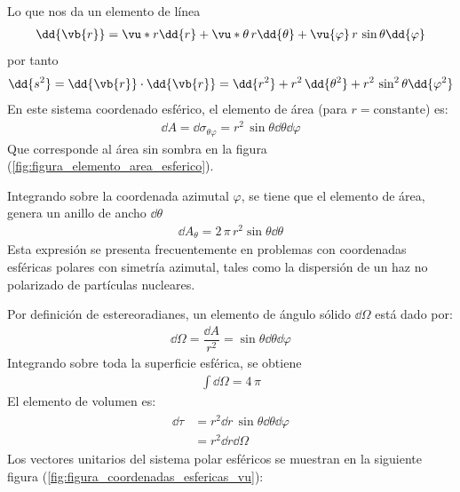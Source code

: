 Lo que nos da un elemento de línea
\begin{align*}
\dd{\vb{r}} = \vu*{r} \dd{r} + \vu*{\theta} \, r \dd{\theta} + \vu{\varphi} \, r \, \sin \theta \dd{\varphi}
\end{align*}
por tanto
\begin{align*}
\dd{s^{2}} = \dd{\vb{r}} \cdot \dd{\vb{r}} =  \dd{r^{2}} + r^{2} \, \dd{\theta^{2}} + r^{2} \, \sin^{2} \theta \dd{\varphi^{2}}
\end{align*}
En este sistema coordenado esférico, el elemento de área (para $r=\text{constante}$) es:
\begin{align*}
\dd{A} = \dd{\sigma_{\theta \varphi}} = r^{2} \, \sin \theta \dd{\theta} \dd{\varphi}
\end{align*}
Que corresponde al área sin sombra en la figura (\ref{fig:figura_elemento_area_esferico}).
\par
Integrando sobre la coordenada azimutal $\varphi$, se tiene que el elemento de área, genera un anillo de ancho $\dd{{\theta}}$
\begin{align*}
\dd{A_{\theta}} = 2 \, \pi \, r^{2} \sin \theta \dd{\theta}
\end{align*}
Esta expresión se presenta frecuentemente en problemas con coordenadas esféricas polares con simetría azimutal, tales como la dispersión de un haz no polarizado de partículas nucleares.
\par
Por definición de estereoradianes, un elemento de ángulo sólido $\dd{\Omega}$ está dado por:
\begin{align*}
\dd{\Omega} = \dfrac{\dd{A}}{r^{2}} = \sin \theta \dd{\theta} \dd{\varphi}
\end{align*}
Integrando sobre toda la superficie esférica, se obtiene
\begin{align*}
\int \dd{\Omega} = 4 \, \pi
\end{align*}
El elemento de volumen es:
\begin{align}
\begin{aligned}
\dd{\tau} &= r^{2} \dd{r} \, \sin \theta \dd{\theta} \dd{\varphi} \\
&= r^{2} \dd{r} \dd{\Omega}
\end{aligned}
\label{eq:ecuacion_02_043}
\end{align}
Los vectores unitarios del sistema polar esféricos se muestran en la siguiente figura (\ref{fig:figura_coordenadas_esfericas_vu}):
